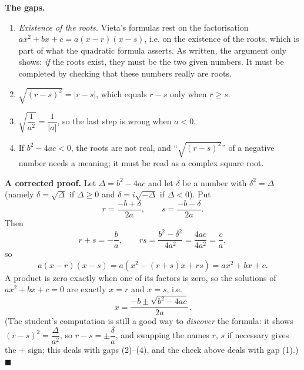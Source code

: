 \textbf{The gaps.}
\begin{enumerate}
\item[(1)] \emph{Existence of the roots.} Vieta's formulas rest on the factorisation $ax^2+bx+c=a(x-r)(x-s)$, i.e. on the existence of the roots, which is part of what the quadratic formula asserts. As written, the argument only shows: \emph{if} the roots exist, they must be the two given numbers. It must be completed by checking that these numbers really are roots.
\item[(2)] $\sqrt{(r-s)^2}=|r-s|$, which equals $r-s$ only when $r\ge s$.
\item[(3)] $\sqrt{\dfrac{1}{a^2}}=\dfrac1{|a|}$, so the last step is wrong when $a<0$.
\item[(4)] If $b^2-4ac<0$, the roots are not real, and ``$\sqrt{(r-s)^2}$'' of a negative number needs a meaning; it must be read as a complex square root.
\end{enumerate}

\textbf{A corrected proof.} Let $\Delta=b^2-4ac$ and let $\delta$ be a number with $\delta^2=\Delta$ (namely $\delta=\sqrt\Delta$ if $\Delta\ge0$ and $\delta=i\sqrt{-\Delta}$ if $\Delta<0$). Put
\[r=\dfrac{-b+\delta}{2a},\qquad s=\dfrac{-b-\delta}{2a}.\]
Then
\[r+s=-\dfrac ba,\qquad rs=\dfrac{b^2-\delta^2}{4a^2}=\dfrac{4ac}{4a^2}=\dfrac ca,\]
so
\[a(x-r)(x-s)=a\left(x^2-(r+s)x+rs\right)=ax^2+bx+c.\]
A product is zero exactly when one of its factors is zero, so the solutions of $ax^2+bx+c=0$ are exactly $x=r$ and $x=s$, i.e.
\[\boxed{x=\dfrac{-b\pm\sqrt{b^2-4ac}}{2a}}.\]
(The student's computation is still a good way to \emph{discover} the formula: it shows $(r-s)^2=\dfrac{\Delta}{a^2}$, so $r-s=\pm\dfrac{\delta}{a}$, and swapping the names $r$, $s$ if necessary gives the $+$ sign; this deals with gaps (2)--(4), and the check above deals with gap (1).) $\blacksquare$
